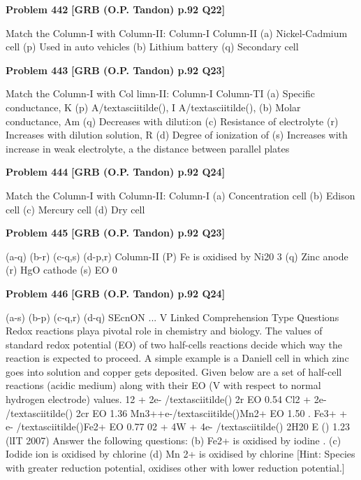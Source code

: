 \begin{problembox}
\textbf{Problem 442} \hfill \textbf{[GRB (O.P. Tandon) p.92 Q22]}
\label{q:ext-grb_all_questions-442}

Match the Column-I with Column-II: 
Column-I 
Column-II 
(a) Nickel-Cadmium cell 
(p) Used in auto vehicles 
(b) Lithium battery 
(q) Secondary cell
\end{problembox}

\begin{problembox}
\textbf{Problem 443} \hfill \textbf{[GRB (O.P. Tandon) p.92 Q23]}
\label{q:ext-grb_all_questions-443}

Match the Column-I with Col limn-II: 
Column-I 
Column-TI 
(a) Specific conductance, K 
(p) A/textasciitilde(), I A/textasciitilde(), 
(b) Molar conductance, Am 
(q) Decreases with diluti:on 
(c) Resistance of electrolyte (r) Increases with dilution 
solution, R 
(d) Degree of ionization of 
(s) Increases with increase in 
weak electrolyte, a 
the distance between parallel 
plates
\end{problembox}

\begin{problembox}
\textbf{Problem 444} \hfill \textbf{[GRB (O.P. Tandon) p.92 Q24]}
\label{q:ext-grb_all_questions-444}

Match the Column-I with Column-II: 
Column-I 
(a) Concentration cell 
(b) Edison cell 
(c) Mercury cell 
(d) Dry cell
\end{problembox}

\begin{problembox}
\textbf{Problem 445} \hfill \textbf{[GRB (O.P. Tandon) p.92 Q23]}
\label{q:ext-grb_all_questions-445}

(a-q) (b-r) (c-q,s) (d-p,r) 
Column-II 
(P) Fe is oxidised by Ni20 3 
(q) Zinc anode 
(r) HgO cathode 
(s) EO 
0
\end{problembox}

\begin{problembox}
\textbf{Problem 446} \hfill \textbf{[GRB (O.P. Tandon) p.92 Q24]}
\label{q:ext-grb_all_questions-446}

(a-s) (b-p) (c-q,r) (d-q) 
SEcnON ... V 
Linked Comprehension Type Questions 
Redox reactions playa pivotal role in chemistry and biology. 
The values of standard redox potential (EO) of two half-cells 
reactions decide which way the reaction is expected to 
proceed. A simple example is a Daniell cell in which zinc goes 
into solution and copper gets deposited. Given below are a set 
of half-cell reactions (acidic medium) along with their EO (V 
with respect to normal hydrogen electrode) values. 
12 + 2e- /textasciitilde() 
2r 
EO 
0.54 
Cl2 + 2e- /textasciitilde() 
2cr 
EO 
1.36 
Mn3++e-/textasciitilde()Mn2+ 
EO 
1.50 
. Fe3+ + e- /textasciitilde()Fe2+ 
EO 
0.77 
02 + 4W + 4e- /textasciitilde() 
2H20 
E () 
1.23 
(lIT 2007) 
Answer the following questions: 
(b) Fe2+ is oxidised by iodine 
. (c) Iodide ion is oxidised by chlorine 
(d) Mn 2+ is oxidised by chlorine 
[Hint: Species with greater reduction potential, oxidises other 
with lower reduction potential.]
\end{problembox}

